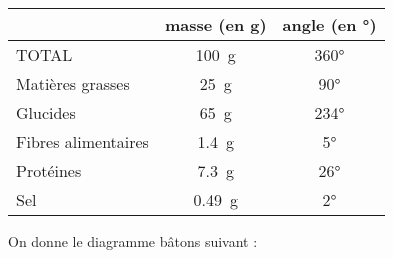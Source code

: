 \documentclass[../Cours.tex]{subfiles}
\begin{document}
\clearpage
\EXERCICES
\begin{questions}
    \exercice 
    \question 
    \begin{center}
        \begin{tabularx}{0.6\linewidth}{|l|C|C|}\hline
            & masse (en \unit{\gram}) & angle (en \unit{°}) \\\hline
            TOTAL & \qty{100}{\gram} & \ang{360} \\ \hline \hline 
            Matières grasses & \qty{25}{\gram} & \ang{90} \\\hline
            Glucides & \qty{65}{\gram} & \ang{234} \\\hline
            Fibres alimentaires & \qty{1.4}{\gram} & \ang{5}  \\\hline
            Protéines & \qty{7.3}{\gram} & \ang{26} \\\hline
            Sel & \qty{0.49}{\gram} & \ang{2} \\\hline
        \end{tabularx}
    \end{center}
    \question 
    \begin{center}
        \begin{tikzpicture}
            
        \end{tikzpicture}
    \end{center}


    \exercice On donne le diagramme bâtons suivant :
    \begin{center}
    \end{center}
\end{questions}
\end{document}
